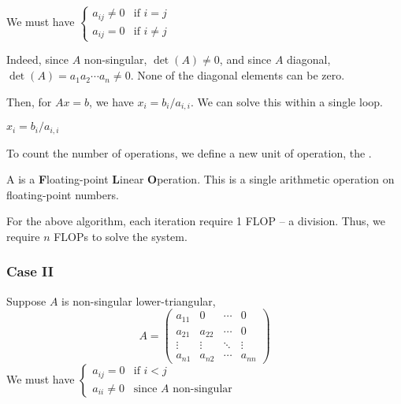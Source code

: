 We must have \( \begin{cases}
    a_{ij} \neq 0 & \text{if } i = j    \\
    a_{ij} = 0    & \text{if } i \neq j
\end{cases} \)

Indeed, since \( A \) non-singular, \( \det(A) \neq 0 \), and since \( A \) diagonal, \( \det(A) = a_1 a_2 \cdots a_n \neq 0 \). None of the diagonal elements can be zero.

Then, for \( Ax = b \), we have \( x_i = b_i / a_{i,i} \). We can solve this within a single loop.

\begin{algorithmic}
    \State \( x_i = b_i / a_{i,i} \)
    \EndFor
\end{algorithmic}

To count the number of operations, we define a new unit of operation, the .

\begin{definition}[FLOP]
    A  is a \textbf{F}loating-point \textbf{L}inear \textbf{O}peration. This is a single arithmetic operation on floating-point numbers.
\end{definition}

\begin{example}
    For the above algorithm, each iteration require 1 FLOP -- a division. Thus, we require \( n \) FLOPs to solve the system.
\end{example}

\subsubsection{Case II}

Suppose \( A \) is non-singular lower-triangular, \[
    A = \begin{pmatrix}
        a_{11} & 0      & \cdots & 0      \\
        a_{21} & a_{22} & \cdots & 0      \\
        \vdots & \vdots & \ddots & \vdots \\
        a_{n1} & a_{n2} & \cdots & a_{nn}
    \end{pmatrix}
\]
We must have \( \begin{cases}
    a_{ij} = 0    & \text{if } i < j                     \\
    a_{ii} \neq 0 & \text{since } A \text{ non-singular}
\end{cases} \)

